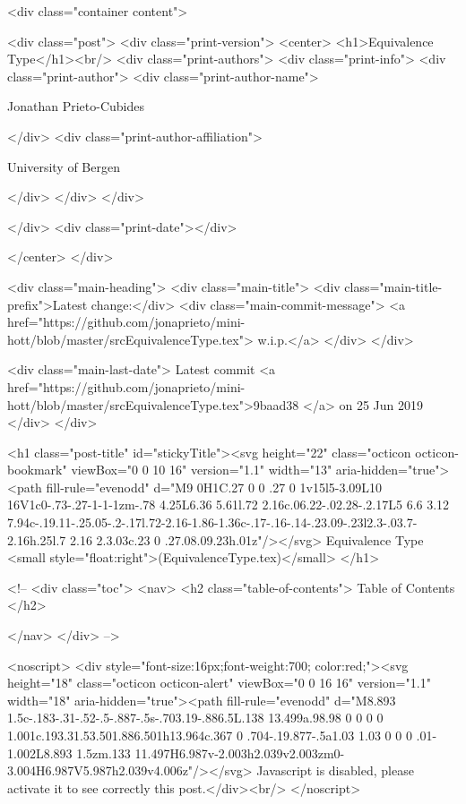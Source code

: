       <div class="container content">
        







<div class="post">
  <div class="print-version">
    <center>
      <h1>Equivalence Type</h1><br/>
        <div class="print-authors">
          <div class="print-info">
            <div class="print-author">
              <div class="print-author-name">
                
                  Jonathan Prieto-Cubides
                
              </div>
              <div class="print-author-affiliation">
                
                  University of Bergen
                
                </div>
            </div>
          </div>
          
          
        </div>
        <div class="print-date"></div>
        
        
    </center>
  </div>

  
  <div class="main-heading">
    <div class="main-title">
      <div class="main-title-prefix">Latest change:</div>
      <div class="main-commit-message">
            <a href="https://github.com/jonaprieto/mini-hott/blob/master/srcEquivalenceType.tex">
              w.i.p.</a>
      </div>
    </div>

    <div class="main-last-date">
      Latest commit <a href="https://github.com/jonaprieto/mini-hott/blob/master/srcEquivalenceType.tex">9baad38 </a> on  25 Jun 2019
    </div>
  </div>
  

  <h1 class="post-title" id="stickyTitle"><svg height="22" class="octicon octicon-bookmark" viewBox="0 0 10 16" version="1.1" width="13" aria-hidden="true"><path fill-rule="evenodd" d="M9 0H1C.27 0 0 .27 0 1v15l5-3.09L10 16V1c0-.73-.27-1-1-1zm-.78 4.25L6.36 5.61l.72 2.16c.06.22-.02.28-.2.17L5 6.6 3.12 7.94c-.19.11-.25.05-.2-.17l.72-2.16-1.86-1.36c-.17-.16-.14-.23.09-.23l2.3-.03.7-2.16h.25l.7 2.16 2.3.03c.23 0 .27.08.09.23h.01z"/></svg> Equivalence Type <small style="float:right">(EquivalenceType.tex)</small>
  </h1>

  <!-- 
  <div class="toc">
    <nav>
    <h2 class="table-of-contents"> Table of Contents </h2>
      

    </nav>
  </div>
   -->

  <noscript>
  <div style="font-size:16px;font-weight:700; color:red;"><svg height="18" class="octicon octicon-alert" viewBox="0 0 16 16" version="1.1" width="18" aria-hidden="true"><path fill-rule="evenodd" d="M8.893 1.5c-.183-.31-.52-.5-.887-.5s-.703.19-.886.5L.138 13.499a.98.98 0 0 0 0 1.001c.193.31.53.501.886.501h13.964c.367 0 .704-.19.877-.5a1.03 1.03 0 0 0 .01-1.002L8.893 1.5zm.133 11.497H6.987v-2.003h2.039v2.003zm0-3.004H6.987V5.987h2.039v4.006z"/></svg> Javascript is disabled, please activate it to see correctly this post.</div><br/>
  </noscript>

